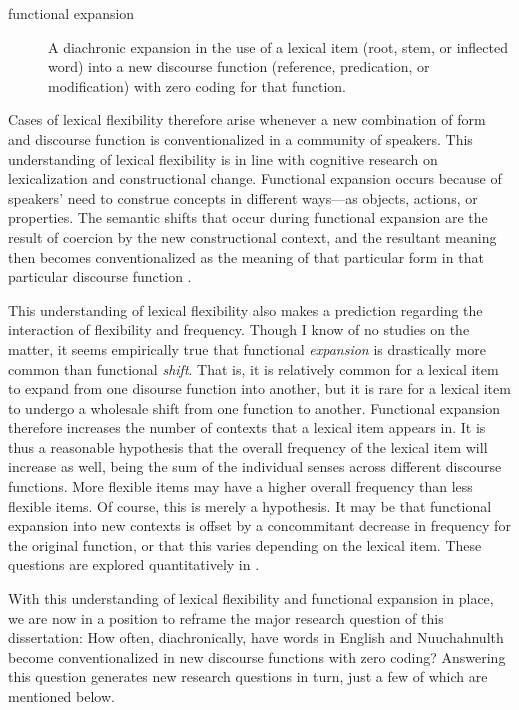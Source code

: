 \begin{description}
  \item[functional expansion] A diachronic expansion in the use of a lexical item (root, stem, or inflected word) into a new discourse function (reference, predication, or modification) with zero coding for that function.
\end{description}

\noindent Cases of lexical flexibility therefore arise whenever a new combination of form and discourse function is conventionalized in a community of speakers. This understanding of lexical flexibility is in line with cognitive research on lexicalization and constructional change. Functional expansion occurs because of speakers' need to construe concepts in different ways—as objects, actions, or properties. The semantic shifts that occur during functional expansion are the result of coercion by the new constructional context, and the resultant meaning then becomes conventionalized as the meaning of that particular form in that particular discourse function \parencite[108]{Croft1991}.

This understanding of lexical flexibility also makes a prediction regarding the interaction of flexibility and frequency. Though I know of no studies on the matter, it seems empirically true that functional \emph{expansion} is drastically more common than functional \emph{shift}. That is, it is relatively common for a lexical item to expand from one disourse function into another, but it is rare for a lexical item to undergo a wholesale shift from one function to another. Functional expansion therefore increases the number of contexts that a lexical item appears in. It is thus a reasonable hypothesis that the overall frequency of the lexical item will increase as well, being the sum of the individual senses across different discourse functions. More flexible items may have a higher overall frequency than less flexible items. Of course, this is merely a hypothesis. It may be that functional expansion into new contexts is offset by a concommitant decrease in frequency for the original function, or that this varies depending on the lexical item. These questions are explored quantitatively in .

With this understanding of lexical flexibility and functional expansion in place, we are now in a position to reframe the major research question of this dissertation: How often, diachronically, have words in English and Nuuchahnulth become conventionalized in new discourse functions with zero coding? Answering this question generates new research questions in turn, just a few of which are mentioned below.

